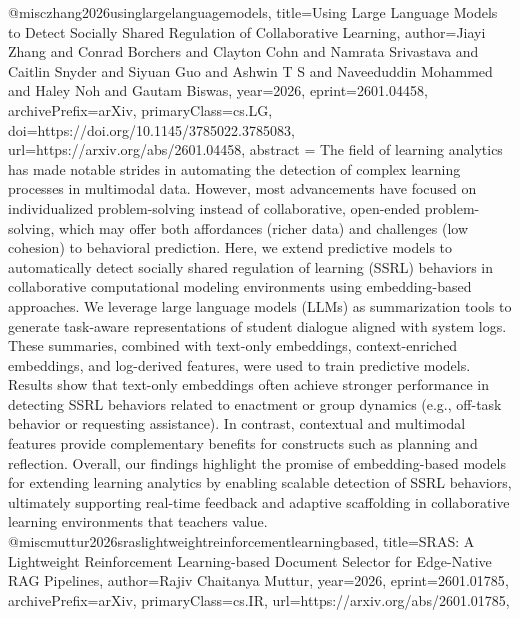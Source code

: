 {}@misc{zhang2026usinglargelanguagemodels,
      title={Using Large Language Models to Detect Socially Shared Regulation of Collaborative Learning}, 
      author={Jiayi Zhang and Conrad Borchers and Clayton Cohn and Namrata Srivastava and Caitlin Snyder and Siyuan Guo and Ashwin T S and Naveeduddin Mohammed and Haley Noh and Gautam Biswas},
      year={2026},
      eprint={2601.04458},
      archivePrefix={arXiv},
      primaryClass={cs.LG},
      doi={https://doi.org/10.1145/3785022.3785083},
      url={https://arxiv.org/abs/2601.04458},
      abstract = {The field of learning analytics has made notable strides in automating the detection of complex learning processes in multimodal data. However, most advancements have focused on individualized problem-solving instead of collaborative, open-ended problem-solving, which may offer both affordances (richer data) and challenges (low cohesion) to behavioral prediction. Here, we extend predictive models to automatically detect socially shared regulation of learning (SSRL) behaviors in collaborative computational modeling environments using embedding-based approaches. We leverage large language models (LLMs) as summarization tools to generate task-aware representations of student dialogue aligned with system logs. These summaries, combined with text-only embeddings, context-enriched embeddings, and log-derived features, were used to train predictive models. Results show that text-only embeddings often achieve stronger performance in detecting SSRL behaviors related to enactment or group dynamics (e.g., off-task behavior or requesting assistance). In contrast, contextual and multimodal features provide complementary benefits for constructs such as planning and reflection. Overall, our findings highlight the promise of embedding-based models for extending learning analytics by enabling scalable detection of SSRL behaviors, ultimately supporting real-time feedback and adaptive scaffolding in collaborative learning environments that teachers value.}
}@misc{muttur2026sraslightweightreinforcementlearningbased,
      title={SRAS: A Lightweight Reinforcement Learning-based Document Selector for Edge-Native RAG Pipelines}, 
      author={Rajiv Chaitanya Muttur},
      year={2026},
      eprint={2601.01785},
      archivePrefix={arXiv},
      primaryClass={cs.IR},
      url={https://arxiv.org/abs/2601.01785},
}
